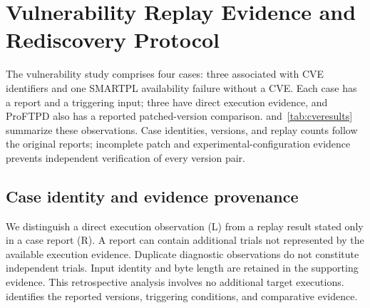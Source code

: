 \section{Vulnerability Replay Evidence and Rediscovery Protocol}
\label{sec:cve}
The vulnerability study comprises four cases: three associated with CVE identifiers and one SMARTPL availability failure without a CVE. Each case has a report and a triggering input; three have direct execution evidence, and ProFTPD also has a reported patched-version comparison.  and~\ref{tab:cveresults} summarize these observations. Case identities, versions, and replay counts follow the original reports; incomplete patch and experimental-configuration evidence prevents independent verification of every version pair.

\subsection{Case identity and evidence provenance}
We distinguish a direct execution observation (L) from a replay result stated only in a case report (R). A report can contain additional trials not represented by the available execution evidence. Duplicate diagnostic observations do not constitute independent trials. Input identity and byte length are retained in the supporting evidence. This retrospective analysis involves no additional target executions.  identifies the reported versions, triggering conditions, and comparative evidence.

